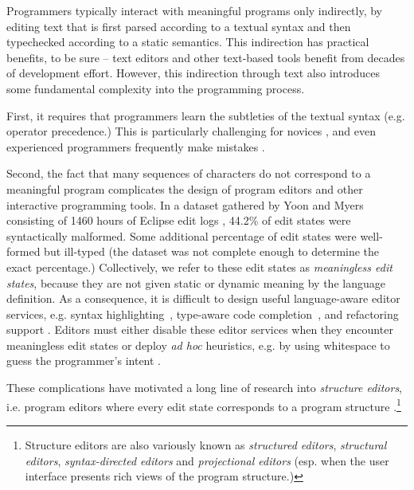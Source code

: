
Programmers typically interact with meaningful programs only
indirectly, by editing text that is first parsed according to a textual
syntax and then typechecked according to a static semantics. This
indirection has practical benefits, to be sure -- text editors and other
text-based tools benefit from decades of development effort. However, this indirection through text also
introduces some fundamental complexity into the programming process.

First, it requires that programmers learn the subtleties of the textual
syntax (e.g. operator precedence.) This is particularly 
challenging for novices \cite{Altadmri:2015:MCI:2676723.2677258,stefik2013empirical}, and even experienced programmers frequently make mistakes \cite{7548903,jones2006developer}.

Second, the fact that many sequences of characters do not correspond to a meaningful
program complicates the design of program editors and other interactive programming tools. 
In a dataset  
gathered by Yoon and Myers consisting of 1460 hours of Eclipse edit logs  \cite{6883030}, 44.2\% of
edit states were syntactically malformed. Some additional
percentage of edit states were well-formed but ill-typed (the dataset was
not complete enough to determine the exact percentage.) Collectively, we refer to these edit states as \emph{meaningless edit states}, because they are not given static or dynamic meaning by the language definition. 
As a consequence, it is difficult
to design useful language-aware editor services, e.g. syntax
highlighting~\cite{sarkar2015impact}, type-aware code
completion~\cite{Mooty:2010:CCC:1915084.1916348,Omar:2012:ACC:2337223.2337324},
and refactoring support \cite{mens2004survey}. Editors must either disable
these editor services when they encounter meaningless edit states or
deploy \emph{ad hoc} heuristics, e.g. by using whitespace to guess the programmer's intent \cite{DBLP:conf/oopsla/KatsJNV09,DBLP:conf/sle/JongeNKV09}.

These complications have motivated a long line of research
into \emph{structure editors}, i.e. program editors where every edit state
corresponds to a program structure \cite{teitelbaum_cornell_1981}.\footnote{Structure editors are also variously known as \emph{structured editors}, \emph{structural editors}, \emph{syntax-directed editors} and \emph{projectional editors} (esp. when the user interface presents rich views of the program structure.)}

